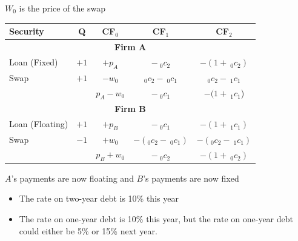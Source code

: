 \begin{frame}{}
    $W_{0}$ is the price of the swap
    \begin{center}
        \begin{tabular}{lcccc}
            Security & Q & CF$_{0}$ & CF$_{1}$ & CF$_{2}$\\ \hline
            \multicolumn{5}{c}{\textbf{Firm A}} \\ \hline
            Loan (Fixed) & $+1$ & $+p_{A}$ & $-\:_{0}c_{2}$ & $-(1+\:_{0}c_{2})$\\
            Swap & $+1$ & $-w_{0}$ & $_{0}c_{2}-\:_{0}c_{1}$ & $_{0}c_{2}-\:_{1}c_{1}$ \\ \hline
            & & $p_{A}-w_{0}$ & $-\:_{0}c_{1}$ & $-(1+\:_{1}c_{1}$) \\ \hline
            \multicolumn{5}{c}{\textbf{Firm B}} \\ \hline
            Loan (Floating) & $+1$ & $+p_{B}$ & $-\:_{0}c_{1}$ & $-(1+\:_{1}c_{1})$ \\
            Swap & $-1$ & $+w_{0}$ & $-(_{0}c_{2}-\:_{0}c_{1})$ & $-(_{0}c_{2}-\:_{1}c_{1})$ \\ \hline
            & & $p_{B}+w_{0}$ & $-\:_{0}c_{2}$ & $-(1+\:_{0}c_{2})$
        \end{tabular}
    \end{center}
    $A$'s payments are now floating and $B$'s payments are now fixed
\end{frame}

\begin{frame}{}
    \begin{itemize}
        \item The rate on two-year debt is 10\% this year
        \item The rate on one-year debt is 10\% this year, but the rate on one-year debt could either be 5\% or 15\% next year. 
    \end{itemize}
    \begin{center}
    \end{center}
\end{frame}


